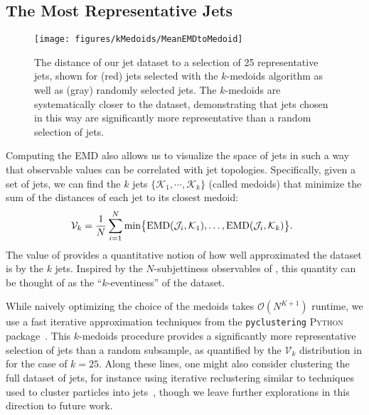 \documentclass[aps,prd,twocolumn,preprintnumbers,nofootinbib,longbibliography,floatfix,superscriptaddress]{revtex4-1}
\begin{document}
\subsection{The Most Representative Jets}
\label{subsec:emd_representative}


\begin{figure}[t]
\texttt{[image: figures/kMedoids/MeanEMDtoMedoid]}
\caption{
\label{fig:medoidsloss}
The distance of our jet dataset to a selection of 25 representative jets, shown for (red) jets selected with the $k$-medoids algorithm as well as (gray) randomly selected jets.
%
The $k$-medoids are systematically closer to the dataset, demonstrating that jets chosen in this way are significantly more representative than a random selection of jets.
}
\end{figure}


Computing the EMD also allows us to visualize the space of jets in such a way that observable values can be correlated with jet topologies.
%
Specifically, given a set of jets, we can find the $k$ jets $\{\mathcal K_1,\cdots,\mathcal K_k\}$ (called medoids) that minimize the sum of the distances of each jet to its closest medoid:
\begin{equation}
\label{eq:kmedoidsloss}
\hspace{-1.9mm}\mathcal{V}_k =\frac1N \sum_{i=1}^N \min\!\big\{\text{EMD}(\mathcal J_i, \mathcal K_1),\ldots,\text{EMD}(\mathcal J_i, \mathcal K_k)\big\}.
\end{equation}
The value of  provides a quantitative notion of how well approximated the dataset is by the $k$ jets.
%
Inspired by the $N$-subjettiness observables of , this quantity can be thought of as the ``$k$-eventiness'' of the dataset.


While naively optimizing the choice of the medoids takes $\mathcal O(N^{K+1})$ runtime, we use a fast iterative approximation techniques from the {\tt pyclustering} \textsc{Python} package~\cite{andrei_novikov_2018_1491324}.
%
This $k$-medoids procedure provides a significantly more representative selection of jets than a random subsample, as quantified by the $\mathcal{V}_k$ distribution in  for the case of $k=25$.
%
Along these lines, one might also consider clustering the full dataset of jets, for instance using iterative reclustering similar to techniques used to cluster particles into jets~\cite{Ellis:1993tq,Catani:1993hr,Dokshitzer:1997in,Wobisch:1998wt,Cacciari:2008gp}, though we leave further explorations in this direction to future work.
\end{document}

